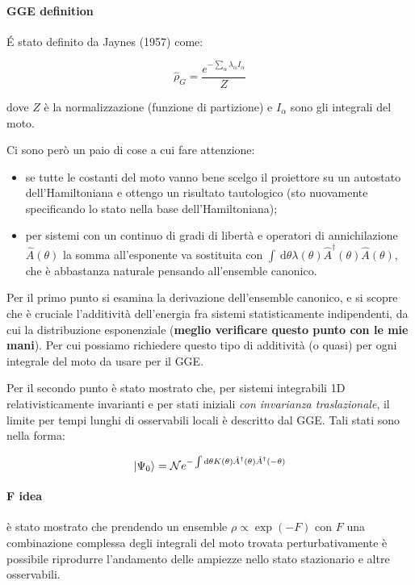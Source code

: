 \documentclass[a4paper,10pt,twocolumn]{article}
\begin{document}
\paragraph{GGE definition} \'E stato definito da Jaynes (1957) come:

\begin{equation}
\hat{\rho}_G = \frac{e^{-\sum_{\alpha} \lambda_\alpha I_\alpha}}{Z}
\end{equation}

\noindent dove $Z$ è la normalizzazione (funzione di partizione) e $I_\alpha$ sono gli integrali del moto.

Ci sono però un paio di cose a cui fare attenzione:
\begin{itemize}
	\item se tutte le costanti del moto vanno bene scelgo il proiettore su un autostato dell'Hamiltoniana e ottengo un risultato tautologico (sto nuovamente specificando lo stato nella base dell'Hamiltoniana);
	\item per sistemi con un continuo di gradi di libertà e operatori di annichilazione $\hat{A}(\theta)$ la somma all'esponente va sostituita con $\int \
	\text{d}\theta \lambda(\theta) \hat{A}^\dagger(\theta) \hat{A}(\theta)$, che è abbastanza naturale pensando all'ensemble canonico.
\end{itemize}

Per il primo punto si esamina la derivazione dell'ensemble canonico, e si scopre che è cruciale l'additività dell'energia fra sistemi statisticamente indipendenti, da cui la distribuzione esponenziale (\textbf{meglio verificare questo punto con le mie mani}). Per cui possiamo richiedere questo tipo di additività (o quasi) per ogni integrale del moto da usare per il GGE.

Per il secondo punto è stato mostrato che, per sistemi integrabili 1D relativisticamente invarianti e per stati iniziali \emph{con invarianza traslazionale}, il limite per tempi lunghi di osservabili locali è descritto dal GGE.
Tali stati sono nella forma:

\begin{equation}
\ket{\Psi_0} = \mathcal{N} e^{- \int \text{d}\theta K(\theta) \hat{A}^\dagger(\theta) \hat{A}^\dagger(-\theta)}
\end{equation}

\paragraph{F idea} è stato mostrato che prendendo un ensemble $\rho \propto \exp(- F)$ con $F$ una combinazione complessa degli integrali del moto trovata perturbativamente è possibile riprodurre l'andamento delle ampiezze nello stato stazionario e altre osservabili.
\end{document}
